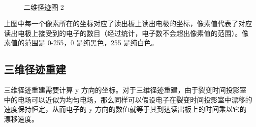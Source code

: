 \documentclass[AutoFakeBold]{LZUThesis}
\begin{document}
\begin{figure}[H]
	\centering
	\\	
    \caption{二维径迹图 2}
    \label{fig_track_2d_2}
\end{figure}

上图中每一个像素所在的坐标对应了读出板上读出电极的坐标，像素值代表了对应读出电极上接受到的电子的数目（经过统计，电子数不会超出像素值的范围）。像素值的范围是 0-255，0 是纯黑色，255 是纯白色。






\subsection{三维径迹重建}
三维径迹重建需要计算 y 方向的坐标。对于三维径迹重建，由于裂变时间投影室中的电场可以近似为均匀电场，那么同样可以假设电子在裂变时间投影室中漂移的速度保持恒定，从而电子的 y 方向的数值就等于其到达读出板上的时间乘以它的漂移速度。
\end{document}
